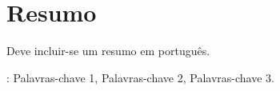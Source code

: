 \pagestyle{MyThesisStyle}
\chapter*{Resumo}\label{resumo}



Deve incluir-se um resumo em portugu\^{e}s.

\vfill
{}: Palavras-chave 1, Palavras-chave 2, Palavras-chave 3.
